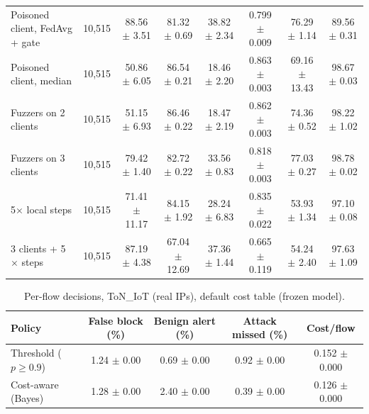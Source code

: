 \begin{table}[t]
\begin{tabular}{lrcccccc}
Poisoned client, FedAvg + gate & 10,515 & 88.56 $\pm$ 3.51 & 81.32 $\pm$ 0.69 & 38.82 $\pm$ 2.34 & 0.799 $\pm$ 0.009 & 76.29 $\pm$ 1.14 & 89.56 $\pm$ 0.31 \\
Poisoned client, median & 10,515 & 50.86 $\pm$ 6.05 & 86.54 $\pm$ 0.21 & 18.46 $\pm$ 2.20 & 0.863 $\pm$ 0.003 & 69.16 $\pm$ 13.43 & 98.67 $\pm$ 0.03 \\
Fuzzers on 2 clients & 10,515 & 51.15 $\pm$ 6.93 & 86.46 $\pm$ 0.22 & 18.47 $\pm$ 2.19 & 0.862 $\pm$ 0.003 & 74.36 $\pm$ 0.52 & 98.22 $\pm$ 1.02 \\
Fuzzers on 3 clients & 10,515 & 79.42 $\pm$ 1.40 & 82.72 $\pm$ 0.22 & 33.56 $\pm$ 0.83 & 0.818 $\pm$ 0.003 & 77.03 $\pm$ 0.27 & 98.78 $\pm$ 0.02 \\
5$\times$ local steps & 10,515 & 71.41 $\pm$ 11.17 & 84.15 $\pm$ 1.92 & 28.24 $\pm$ 6.83 & 0.835 $\pm$ 0.022 & 53.93 $\pm$ 1.34 & 97.10 $\pm$ 0.08 \\
3 clients + 5$\times$ steps & 10,515 & 87.19 $\pm$ 4.38 & 67.04 $\pm$ 12.69 & 37.36 $\pm$ 1.44 & 0.665 $\pm$ 0.119 & 54.24 $\pm$ 2.40 & 97.63 $\pm$ 1.09 \\
\bottomrule\end{tabular}\end{table}

\begin{table}[t]\centering
\caption{Per-flow decisions, ToN\_IoT (real IPs), default cost table (frozen model).}
\label{tab:policy_ton}
\begin{tabular}{lcccc}\toprule
Policy & False block (\%) & Benign alert (\%) & Attack missed (\%) & Cost/flow \\ \midrule
Threshold ($p\geq0.9$) & 1.24 $\pm$ 0.00 & 0.69 $\pm$ 0.00 & 0.92 $\pm$ 0.00 & 0.152 $\pm$ 0.000 \\
Cost-aware (Bayes) & 1.28 $\pm$ 0.00 & 2.40 $\pm$ 0.00 & 0.39 $\pm$ 0.00 & 0.126 $\pm$ 0.000 \\
\bottomrule\end{tabular}\end{table}

